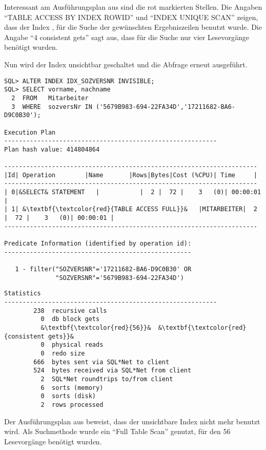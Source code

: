           Interessant am Ausf\"uhrungsplan aus  sind die rot markierten Stellen. Die Angaben \enquote{TABLE ACCESS BY INDEX ROWID} und \enquote{INDEX UNIQUE SCAN} zeigen, dass der Index , f\"ur die Suche der gew\"unschten Ergebniszeilen benutzt wurde. Die Angabe \enquote{4 consistent gets} sagt aus, dass f\"ur die Suche nur vier Lesevorg\"ange ben\"otigt wurden.

          Nun wird der Index unsichtbar geschaltet und die Abfrage erneut ausgef\"uhrt.
          \begin{lstlisting}[caption={Der Index wird unsichtbar und das Statement wird wiederholt},label=admin328,language=oracle_sql]
SQL> ALTER INDEX IDX_SOZVERSNR INVISIBLE;
SQL> SELECT vorname, nachname
  2  FROM   Mitarbeiter
  3  WHERE  sozversNr IN ('5679B983-694-22FA34D','17211682-BA6-D9C0B30');

Execution Plan
----------------------------------------------------------
Plan hash value: 414804864

---------------------------------------------------------------------
|Id| Operation        |Name       |Rows|Bytes|Cost (%CPU)| Time     |
---------------------------------------------------------------------
| 0|&SELECT& STATEMENT   |           |  2 |  72 |    3   (0)| 00:00:01 |
| 1| &\textbf{\textcolor{red}{TABLE ACCESS FULL}}&   |MITARBEITER|  2 |  72 |    3   (0)| 00:00:01 |
---------------------------------------------------------------------

Predicate Information (identified by operation id):
---------------------------------------------------

   1 - filter("SOZVERSNR"='17211682-BA6-D9C0B30' OR
              "SOZVERSNR"='5679B983-694-22FA34D')
          \end{lstlisting}
\clearpage
          \begin{lstlisting}[caption={Der Index wird unsichtbar und das
          Statement wird wiederholt - Fortsetzung},language=terminal]
Statistics
----------------------------------------------------------
        238  recursive calls
          0  db block gets
          &\textbf{\textcolor{red}{56}}&  &\textbf{\textcolor{red}{consistent gets}}&
          0  physical reads
          0  redo size
        666  bytes sent via SQL*Net to client
        524  bytes received via SQL*Net from client
          2  SQL*Net roundtrips to/from client
          6  sorts (memory)
          0  sorts (disk)
          2  rows processed
          \end{lstlisting}
          Der Ausf\"uhrungsplan aus  beweist, dass der unsichtbare Index nicht mehr benutzt wird. Als Suchmethode wurde ein \enquote{Full Table Scan} genutzt, f\"ur den 56 Lesevorg\"ange ben\"otigt wurden.

